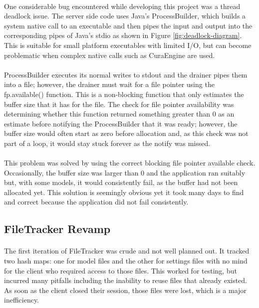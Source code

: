 \paragraph{}
One considerable bug encountered while developing this project was a thread deadlock issue. 
The server side code uses Java's ProcessBuilder, which builds a system native call to an executable and then pipes the input and output into the corresponding pipes of Java's stdio as shown in Figure \ref{fig:deadlock-diagram}.
This is suitable for small platform executables with limited I/O, but can become problematic when complex native calls such as CuraEngine are used.

\paragraph{}
ProcessBuilder executes its normal writes to stdout and the drainer pipes them into a file; however, the drainer must wait for a file pointer using the fp.available() function. 
This is a non-blocking function that only estimates the buffer size that it has for the file. 
The check for file pointer availability was determining whether this function returned something greater than 0 as an estimate before notifying the ProcessBuilder that it was ready;
however, the buffer size would often start as zero before allocation and, as this check was not part of a loop, it would stay stuck forever as the notify was missed.

\paragraph{}
This problem was solved by using the correct blocking file pointer available check. 
Occasionally, the buffer size was larger than 0 and the application ran suitably but, with some models, it would consistently fail, as the buffer had not been allocated yet.
This solution is seemingly obvious yet it took many days to find and correct because the application did not fail consistently.

\subsection{FileTracker Revamp}
\paragraph{}
The first iteration of FileTracker was crude and not well planned out. 
It tracked two hash maps: one for model files and the other for settings files with no mind for the client who required access to those files. 
This worked for testing, but incurred many pitfalls including the inability to reuse files that already existed. 
As soon as the client closed their session, those files were lost, which is a major inefficiency.

